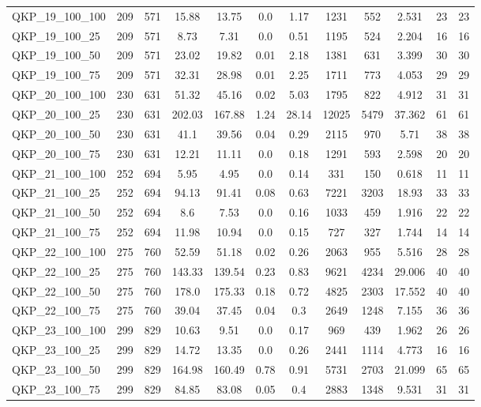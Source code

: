 \begin{table}[!h]
{\begin{tabular}{lccccccccccc}
QKP\_19\_100\_100 & 209 & 571 & 15.88 & 13.75 & 0.0 & 1.17 & 1231 & 552 & 2.531 & 23 & 23\\
QKP\_19\_100\_25 & 209 & 571 & 8.73 & 7.31 & 0.0 & 0.51 & 1195 & 524 & 2.204 & 16 & 16\\
QKP\_19\_100\_50 & 209 & 571 & 23.02 & 19.82 & 0.01 & 2.18 & 1381 & 631 & 3.399 & 30 & 30\\
QKP\_19\_100\_75 & 209 & 571 & 32.31 & 28.98 & 0.01 & 2.25 & 1711 & 773 & 4.053 & 29 & 29\\
QKP\_20\_100\_100 & 230 & 631 & 51.32 & 45.16 & 0.02 & 5.03 & 1795 & 822 & 4.912 & 31 & 31\\
QKP\_20\_100\_25 & 230 & 631 & 202.03 & 167.88 & 1.24 & 28.14 & 12025 & 5479 & 37.362 & 61 & 61\\
QKP\_20\_100\_50 & 230 & 631 & 41.1 & 39.56 & 0.04 & 0.29 & 2115 & 970 & 5.71 & 38 & 38\\
QKP\_20\_100\_75 & 230 & 631 & 12.21 & 11.11 & 0.0 & 0.18 & 1291 & 593 & 2.598 & 20 & 20\\
QKP\_21\_100\_100 & 252 & 694 & 5.95 & 4.95 & 0.0 & 0.14 & 331 & 150 & 0.618 & 11 & 11\\
QKP\_21\_100\_25 & 252 & 694 & 94.13 & 91.41 & 0.08 & 0.63 & 7221 & 3203 & 18.93 & 33 & 33\\
QKP\_21\_100\_50 & 252 & 694 & 8.6 & 7.53 & 0.0 & 0.16 & 1033 & 459 & 1.916 & 22 & 22\\
QKP\_21\_100\_75 & 252 & 694 & 11.98 & 10.94 & 0.0 & 0.15 & 727 & 327 & 1.744 & 14 & 14\\
QKP\_22\_100\_100 & 275 & 760 & 52.59 & 51.18 & 0.02 & 0.26 & 2063 & 955 & 5.516 & 28 & 28\\
QKP\_22\_100\_25 & 275 & 760 & 143.33 & 139.54 & 0.23 & 0.83 & 9621 & 4234 & 29.006 & 40 & 40\\
QKP\_22\_100\_50 & 275 & 760 & 178.0 & 175.33 & 0.18 & 0.72 & 4825 & 2303 & 17.552 & 40 & 40\\
QKP\_22\_100\_75 & 275 & 760 & 39.04 & 37.45 & 0.04 & 0.3 & 2649 & 1248 & 7.155 & 36 & 36\\
QKP\_23\_100\_100 & 299 & 829 & 10.63 & 9.51 & 0.0 & 0.17 & 969 & 439 & 1.962 & 26 & 26\\
QKP\_23\_100\_25 & 299 & 829 & 14.72 & 13.35 & 0.0 & 0.26 & 2441 & 1114 & 4.773 & 16 & 16\\
QKP\_23\_100\_50 & 299 & 829 & 164.98 & 160.49 & 0.78 & 0.91 & 5731 & 2703 & 21.099 & 65 & 65\\
QKP\_23\_100\_75 & 299 & 829 & 84.85 & 83.08 & 0.05 & 0.4 & 2883 & 1348 & 9.531 & 31 & 31\\

\end{tabular}}
\end{table}
